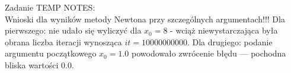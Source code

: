 \documentclass{classrep}
\begin{document}
		Zadanie 
		TEMP NOTES:	 \\
		Wnioski dla wyników metody Newtona przy szczególnych argumentach!!!		
		Dla pierwszego: nie udało się wyliczyć dla $x_0=8$ - wciąż niewystarczająca była obrana liczba iteracji wynosząca $it=10000000000$.
		Dla drugiego: podanie argumentu początkowego $x_0=1.0$ powodowało zwrócenie błędu --- pochodna bliska wartości $0.0$.
		
\end{document}
